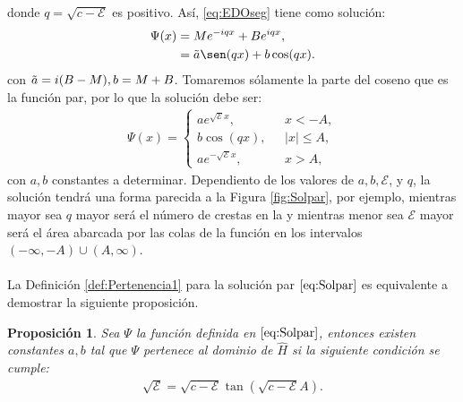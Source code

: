 \documentclass[12pt]{article}
\newtheorem{prop}[teo]{Proposición}
\theoremstyle{definition}
\begin{document}
donde $q = \sqrt{c-\mathcal{E}}$ es positivo. Así, \eqref{eq:EDOseg} tiene como solución:
\begin{align*}
    \Psi(x) &= Me^{-iqx} + Be^{iqx},
    \\
    & =
    \Tilde{a}\sen(qx) + b\cos(qx).
\end{align*}
con $\Tilde{a}=i(B-M), b = M+B$. Tomaremos sólamente la parte del coseno que es la función par, por lo que la solución debe ser:
\begin{align}
        \Psi(x) = 
        \left\{ \begin{array}{ll}
        ae^{\sqrt{\mathcal{E}}x},& \:\:\:  x < -A,
        \\
        b\cos(qx), & \:\:\: |x| \leq A,
        \\
        ae^{-\sqrt{\mathcal{E}}x},& \:\:\: x > A,
        \end{array}
        \right.
        \label{eq:Solpar}
\end{align}
con $a, b$ constantes a determinar. Dependiento de los  valores de
$a,b,\mathcal{E}$, y $q$, la solución tendrá una forma parecida a la Figura \ref{fig:Solpar}, por ejemplo, mientras mayor sea $q$ mayor será el número de crestas en la y mientras menor sea $\mathcal{E}$ mayor será el área abarcada por las colas de la función en los intervalos $(-\infty,-A)\cup(A,\infty)$.
\\ \\
La Definición \ref{def:Pertenencia1} para la solución  par $\eqref{eq:Solpar}$ es equivalente a demostrar la siguiente proposición.
\begin{prop}
    Sea $\Psi$ la función definida en $\eqref{eq:Solpar}$, entonces existen constantes $a,b$ tal que $\Psi$ pertenece al dominio de $\hat{H}$ si la siguiente condición se cumple:
    \begin{align}
        \sqrt{\mathcal{E}} = \sqrt{c-\mathcal{E}}\tan(\sqrt{c-\mathcal{E}}A). \label{eq:Trascendentalpar}
    \end{align}
\end{prop}
\end{document}
